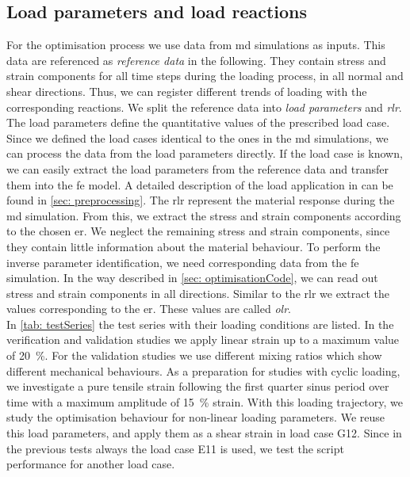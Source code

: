 \subsection{Load parameters and load reactions}\label{subsec:loadParameters}
For the optimisation process we use data from \acrshort{md} simulations as inputs. This data are referenced as \emph{reference data} in the following. They contain stress and strain components for all time steps during the loading process, in all normal and shear directions. Thus, we can register different trends of loading with the corresponding reactions.
We split the reference data into \emph{load parameters} and \emph{\acrlong{rlr}}. The load parameters define the quantitative values of the prescribed load case. 
Since we defined the load cases identical to the ones in the \acrshort{md} simulations, we can process the data from the load parameters directly. 
If the load case is known, we can easily extract the load parameters from the reference data and transfer them into the \acrshort{fe} model. A detailed description of the load application in  can be found in \autoref{sec: preprocessing}. 
The \acrlong{rlr} represent the material response during the \acrshort{md} simulation. From this, we extract the stress and strain components according to the chosen \acrlong{er}. 
We neglect the remaining stress and strain components, since they contain little information about the material behaviour.
To perform the inverse parameter identification, we need corresponding data from the \acrshort{fe} simulation.
In the way described in \autoref{sec: optimisationCode}, we can read out stress and strain components in all directions. Similar to the \acrlong{rlr} we extract the values corresponding to the \acrlong{er}. These values are called \emph{\acrlong{olr}}. \\
\indent In \autoref{tab: testSeries} the test series with their loading conditions are listed.
In the verification and validation studies we apply linear strain up to a maximum value of 20 \%. For the validation studies we use different mixing ratios which show different mechanical behaviours. As a preparation for studies with cyclic loading, we investigate a pure tensile strain following the first quarter sinus period over time with a maximum amplitude of 15 \% strain. With this loading trajectory, we study the optimisation behaviour for non-linear loading parameters.
We reuse this load parameters, and apply them as a shear strain in load case G12. Since in the previous tests always the load case E11 is used, we test the script performance for another load case.

